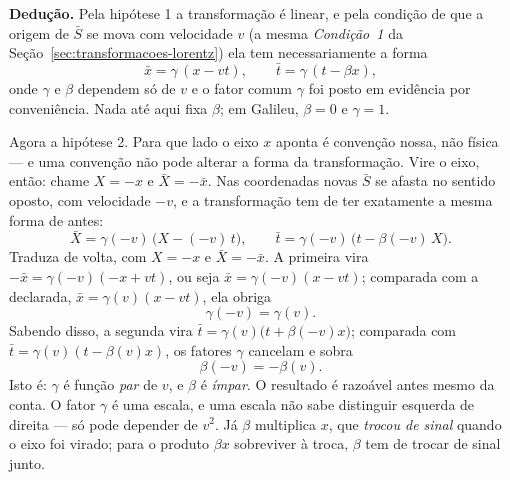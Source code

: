 \documentclass[12pt,a4paper,oneside]{book}
\theoremstyle{rgplain}
\theoremstyle{rgremark}
\begin{document}
\begin{resultado}
\textbf{Dedução.} Pela hipótese 1 a transformação é linear, e pela condição de
que a origem de $\bar S$ se mova com velocidade $v$ (a mesma
\emph{Condição~1} da Seção~\ref{sec:transformacoes-lorentz}) ela tem
necessariamente a forma
\[
  \bar x=\gamma\,(x-vt),\qquad \bar t=\gamma\,(t-\beta x),
\]
onde $\gamma$ e $\beta$ dependem só de $v$ e o fator comum $\gamma$ foi posto
em evidência por conveniência. Nada até aqui fixa $\beta$; em Galileu,
$\beta=0$ e $\gamma=1$.

Agora a hipótese 2. Para que lado o eixo $x$ aponta é convenção nossa, não
física --- e uma convenção não pode alterar a forma da transformação. Vire o
eixo, então: chame $X=-x$ e $\bar X=-\bar x$. Nas coordenadas novas $\bar S$ se afasta no
sentido oposto, com velocidade $-v$, e a transformação tem de ter exatamente a
mesma forma de antes:
\[
  \bar X=\gamma(-v)\,\bigl(X-(-v)\,t\bigr),\qquad
  \bar t=\gamma(-v)\,\bigl(t-\beta(-v)\,X\bigr).
\]
Traduza de volta, com $X=-x$ e $\bar X=-\bar x$. A primeira vira
$-\bar x=\gamma(-v)(-x+vt)$, ou seja $\bar x=\gamma(-v)(x-vt)$; comparada com a
declarada, $\bar x=\gamma(v)(x-vt)$, ela obriga
\[
  \gamma(-v)=\gamma(v).
\]
Sabendo disso, a segunda vira $\bar t=\gamma(v)\bigl(t+\beta(-v)x\bigr)$; comparada
com $\bar t=\gamma(v)(t-\beta(v)x)$, os fatores $\gamma$ cancelam e sobra
\[
  \beta(-v)=-\beta(v).
\]
Isto é: $\gamma$ é função \emph{par} de $v$, e $\beta$ é \emph{ímpar}. O
resultado é razoável antes mesmo da conta. O fator $\gamma$ é uma escala, e uma
escala não sabe distinguir esquerda de direita --- só pode depender de $v^2$. Já
$\beta$ multiplica $x$, que \emph{trocou de sinal} quando o eixo foi virado; para
o produto $\beta x$ sobreviver à troca, $\beta$ tem de trocar de sinal junto.


\end{resultado}
\end{document}
